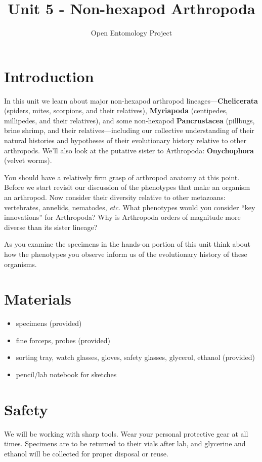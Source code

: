 \documentclass[letterpaper, 11pt]{article}
\title{Unit 5 - Non-hexapod Arthropoda}
\author{Open Entomology Project}
\begin{document}
\cleanlookdateon %
\maketitle
\thispagestyle{fancy}
\section*{Introduction}
In this unit we learn about major non-hexapod arthropod lineages---\textbf{Chelicerata} (spiders, mites, scorpions, and their relatives), \textbf{Myriapoda} (centipedes, millipedes, and their relatives), and some non-hexapod \textbf{Pancrustacea} (pillbugs, brine shrimp, and their relatives---including our collective understanding of their natural histories and hypotheses of their evolutionary history relative to other arthropods. We'll also look at the putative sister to Arthropoda: \textbf{Onychophora} (velvet worms).

You should have a relatively firm grasp of arthropod anatomy at this point. Before we start revisit our discussion of the phenotypes that make an organism an arthropod. Now consider their diversity relative to other metazoans: vertebrates, annelids, nematodes, \textit{etc}. What phenotypes would you consider ``key innovations'' for Arthropoda? Why is Arthropoda orders of magnitude more diverse than its sister lineage?

As you examine the specimens in the hands-on portion of this unit think about how the phenotypes you observe inform us of the evolutionary history of these organisms.

\section*{Materials}
\begin{itemize}
\item specimens (provided)
\item fine forceps, probes (provided)
\item sorting tray, watch glasses, gloves, safety glasses, glycerol, ethanol (provided)
\item pencil/lab notebook for sketches
\end{itemize}

\section*{Safety}
We will be working with sharp tools. Wear your personal protective gear at all times. Specimens are to be returned to their vials after lab, and glycerine and ethanol will be collected for proper disposal or reuse.
\end{document}
